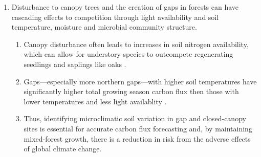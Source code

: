 \documentclass{article}\usepackage[]{graphicx}\usepackage[]{color}
\begin{document}
\begin{enumerate}
\item Disturbance to canopy trees and the creation of gaps in forests can have cascading effects to competition through light availability and soil temperature, moisture and microbial community structure.
  \begin{enumerate}
  \item Canopy disturbance often leads to increases in soil nitrogen availability, which can allow for understory species to outcompete regenerating seedlings and saplings like oaks \citep{Taylor2016, Mladenoff1987}.
  \item Gaps---especially more northern gaps---with higher soil temperatures have significantly higher total growing season carbon flux then those with lower temperatures and less light availablity \citep{Schatz2012, Raymond2006}.
  \item Thus, identifying microclimatic soil variation in gap and closed-canopy sites is essential for accurate carbon flux forecasting and, by maintaining mixed-forest growth, there is a reduction in risk from the adverse effects of global climate change. 
  \end{enumerate}


  

\end{enumerate}
\end{document}
